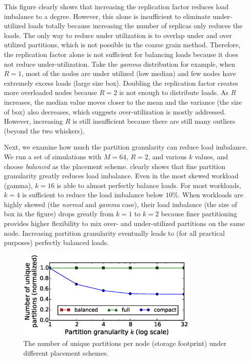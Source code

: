 This figure clearly shows that increasing the replication factor
reduces load imbalance to a degree.
However, this alone is insufficient to eliminate
under-utilized loads totally because
increasing the number of replicas only reduces the loads.
The only way to reduce under utilization is
to overlap under and over utilized partitions,
which is not possible in the coarse grain method. 
Therefore, the replication factor alone is not sufficient
for balancing loads because it does not reduce under-utilization.
Take the \emph{gamma} distribution for example,
when $R=1$, most of the nodes are under utilized (low median) and
few nodes have extremely excess loads (large size box).
Doubling the replication factor creates more overloaded nodes
because $R=2$ is not enough to distribute loads.
As $R$ increases, the median value moves closer to the mean and
the variance (the size of box) also decreases,
which suggests over-utilization is mostly addressed.
However, increasing $R$ is still insufficient because
there are still many outliers (beyond the two whiskers).


Next, we examine how much the partition granularity can reduce load imbalance.
We run a set of simulations with $M=64$, $R=2$, and various $k$ values,
and choose \emph{balanced} as the placement scheme.
\myfigure{\ref{fig:simulation_imbalance_fine}} clearly shows that
fine partition granularity greatly reduces load imbalance.
Even in the most skewed workload (gamma), $k=16$ is able to almost perfectly balance loads.
For most workloads, $k=4$ is sufficient to reduce the load imbalance
below $10\%$.
When workloads are highly skewed (the \emph{normal} and \emph{gamma} case),
their load imbalance (the size of box in the figure) drops greatly from $k=1$ to $k=2$
because finer partitioning provides higher flexibility to mix
over- and under-utilized partitions on the same node.
Increasing partition granularity eventually leads to (for all
practical purposes)
perfectly balanced loads.


\begin{figure}[!htbp]
    \centering
    \includegraphics[width=0.8\textwidth]{figures/E42_simulation_colors_resized_powerlaw.eps}
    \caption{The number of unique partitions per node (storage footprint) under different placement schemes.}
    \label{fig:simulation_colors}
\end{figure}

